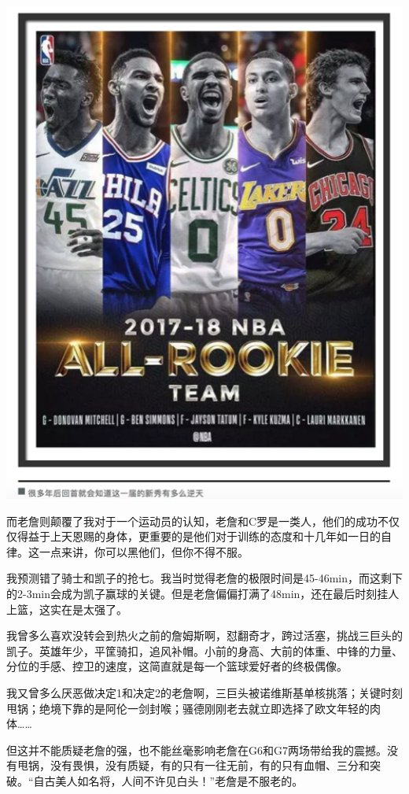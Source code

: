 \documentclass[
]{book}
\begin{document}
\includegraphics[width=6.71in]{images/nba6}

而老詹则颠覆了我对于一个运动员的认知，老詹和C罗是一类人，他们的成功不仅仅得益于上天恩赐的身体，更重要的是他们对于训练的态度和十几年如一日的自律。这一点来讲，你可以黑他们，但你不得不服。

我预测错了骑士和凯子的抢七。我当时觉得老詹的极限时间是45-46min，而这剩下的2-3min会成为凯子赢球的关键。但是老詹偏偏打满了48min，还在最后时刻挂人上篮，这实在是太强了。

我曾多么喜欢没转会到热火之前的詹姆斯啊，怼翻奇才，跨过活塞，挑战三巨头的凯子。英雄年少，平筐骑扣，追风补帽。小前的身高、大前的体重、中锋的力量、分位的手感、控卫的速度，这简直就是每一个篮球爱好者的终极偶像。

我又曾多么厌恶做决定1和决定2的老詹啊，三巨头被诺维斯基单核挑落；关键时刻甩锅；绝境下靠的是阿伦一剑封喉；骚德刚刚老去就立即选择了欧文年轻的肉体\ldots\ldots{}

但这并不能质疑老詹的强，也不能丝毫影响老詹在G6和G7两场带给我的震撼。没有甩锅，没有畏惧，没有质疑，有的只有一往无前，有的只有血帽、三分和突破。``自古美人如名将，人间不许见白头！''老詹是不服老的。
\end{document}
